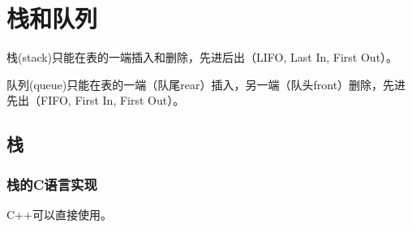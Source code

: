 \chapter{栈和队列}

栈(stack)只能在表的一端插入和删除，先进后出（LIFO, Last In, First Out）。

队列(queue)只能在表的一端（队尾rear）插入，另一端（队头front）删除，先进先出（FIFO, First In, First Out）。

\section{栈} %

\subsection{栈的C语言实现}
C++可以直接使用。

